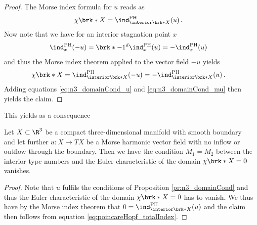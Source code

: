 \begin{proof}
  The Morse index formula for $u$ reads as
  \begin{align}
    \chi\brk*{X}=\ind^\text{PH}_{\interior\brk*{X}}(u)\,.\label{eq:n3_domainCond_u}
  \end{align}
  Now note that we have for an interior stagnation point $x$
  \begin{align*}
    \ind^\text{PH}_{x}(-u)=\brk*{-1}^d\ind^\text{PH}_{x}(u)=-\ind^\text{PH}_{x}(u)
  \end{align*}
  and thus the Morse index theorem applied to the vector field $-u$ yields
  \begin{align}
    \chi\brk*{X}=\ind^\text{PH}_{\interior\brk*{X}}(-u)=-\ind^\text{PH}_{\interior\brk*{X}}(u)\,.\label{eq:n3_domainCond_mu}
  \end{align}
  Adding equations \eqref{eq:n3_domainCond_u} and \eqref{eq:n3_domainCond_mu} then yields the claim.
\end{proof}
This yields as a consequence
\begin{corollary}\label{co:n3_conditionTypeNbrII}
  Let $X\subset\R^3$ be a compact three-dimensional manifold with smooth boundary and let further
  $u\colon X\to TX$ be a Morse harmonic vector field with no
  inflow or outflow through the boundary. Then
  we have the condition $M_1=M_2$ between the interior type numbers and the Euler characteristic of the domain $\chi\brk*{X}=0$ vanishes.
\end{corollary}
\begin{proof}
  Note that $u$ fulfils the conditions of Proposition \ref{pr:n3_domainCond} and thus the Euler characteristic
  of the domain $\chi\brk*{X}=0$ has to vanish.
  We thus have by the Morse index theorem that $0=\ind^\text{PH}_{\interior\brk*{X}}(u)$ and the claim then follows from equation
  \eqref{eq:poincareHopf_totalIndex}.
\end{proof}
